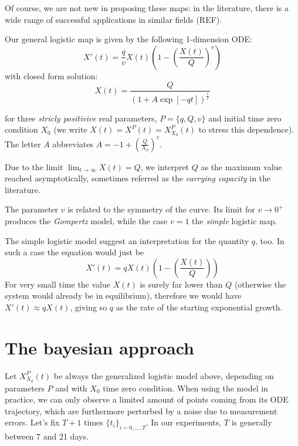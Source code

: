\documentclass[8pt]{article}
\begin{document}
Of course, we are not new in proposing these maps: in the literature,
there is a wide range of successful applications in similar fields (REF).


Our general logistic map is given by the following 1-dimension ODE:
\begin{equation}
	X'(t) = \frac{q}{v} X(t) 
	\left ( 1 - \left( \frac{X(t)}{Q} \right)^{v}\right )
\end{equation}
with closed form solution:
\begin{equation}
	X(t) = \frac{Q} { (1 + A \exp[-q t])^{\frac{1}{v}}}
\end{equation}

for three \emph{stricly positivive} real parameters, 
$P = \{ q, Q, v\}$ and initial time zero condition $X_0$
(we write $X(t) = X^P(t) = X^P_{X_0}(t)$ to stress this dependence).
The letter $A$ abbreviates 
$A = -1 + \left ( \frac{Q} { X_0} \right )^{v}$.


Due to the limit $\lim_{t \to \infty} X(t) = Q$, 
we interpret $Q$ as
the maximum value reached asymptotically, sometimes
referred as the \emph{carrying capacity} in the literature.


The parameter $v$ is related to the symmetry of the curve.
Its limit for $v \to 0^+$ produces the \emph{Gompertz} model,
while the case $v = 1$ the \emph{simple} logistic map.


The simple logistic model suggest an interpretation for the quantity
$q$, too. In such a case the equation would just be
\begin{equation}
	X'(t) = q X(t) 
	\left ( 1 - \left( \frac{X(t)}{Q} \right)\right )
\end{equation}
For very small time the value $X(t)$ is surely far lower than
$Q$ (otherwise the system would already be in equilibrium), therefore
we would have $X'(t) \approx q X(t)$, giving so
$q$ as the rate of the starting exponential growth.


\section{The bayesian approach}
Let $X^P_{X_0}(t)$ be always the generalized logistic model above,
depending on
parameters $P$ and with $X_0$ time zero condition.
When using the model in practice, we can only observe a
limited amount of points coming from its ODE trajectory, 
which are furthermore perturbed by a noise due to measurement
errors.
Let's fix $T+1$ times $\{t_i\}_{i = 0,\dots, T}$.
In our experiments, $T$ is generally between 7 and 21 days.
\end{document}
